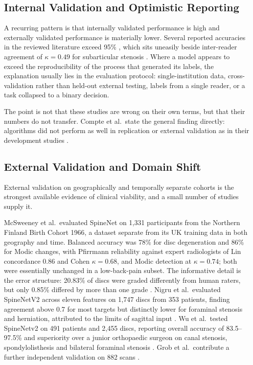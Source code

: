 \subsection{Internal Validation and Optimistic Reporting}
\label{sec:lr-internal-validation}

A recurring pattern is that internally validated performance is high and
externally validated performance is materially lower. Several reported accuracies
in the reviewed literature exceed 95\%
\cite{shahzadi2023nerve,liawrungrueang2023automatic,liu2025automated,tabarestani2026a},
which sits uneasily beside inter-reader agreement of $\kappa = 0.49$ for
subarticular stenosis \cite{lurie2008reliability}. Where a model appears to
exceed the reproducibility of the process that generated its labels, the
explanation usually lies in the evaluation protocol: single-institution data,
cross-validation rather than held-out external testing, labels from a single
reader, or a task collapsed to a binary decision.

The point is not that these studies are wrong on their own terms, but that
their numbers do not transfer. Compte et al.\ state the general finding
directly: algorithms did not perform as well in replication or external
validation as in their development studies \cite{compte2023are}.

\subsection{External Validation and Domain Shift}
\label{sec:lr-generalization}

External validation on geographically and temporally separate cohorts is the
strongest available evidence of clinical viability, and a small number of
studies supply it.

McSweeney et al.\ evaluated SpineNet on 1{,}331 participants from the Northern
Finland Birth Cohort 1966, a dataset separate from its UK training data in both
geography and time. Balanced accuracy was 78\% for disc degeneration and 86\%
for Modic changes, with Pfirrmann reliability against expert radiologists of Lin
concordance 0.86 and Cohen $\kappa = 0.68$, and Modic detection at
$\kappa = 0.74$; both were essentially unchanged in a low-back-pain subset. The
informative detail is the error structure: 20.83\% of discs were graded
differently from human raters, but only 0.85\% differed by more than one grade
\cite{mcsweeney2023external}. Nigru et al.\ evaluated SpineNetV2 across eleven
features on 1{,}747 discs from 353 patients, finding agreement above 0.7 for most
targets but distinctly lower for foraminal stenosis and herniation, attributed
to the limits of sagittal input \cite{nigru2024external}. Wu et al.\ tested
SpineNetv2 on 491 patients and 2{,}455 discs, reporting overall accuracy of
83.5--97.5\% and superiority over a junior orthopaedic surgeon on canal stenosis,
spondylolisthesis and bilateral foraminal stenosis \cite{wu2026external}. Grob et
al.\ contribute a further independent validation on 882 scans
\cite{grob2022external}.

